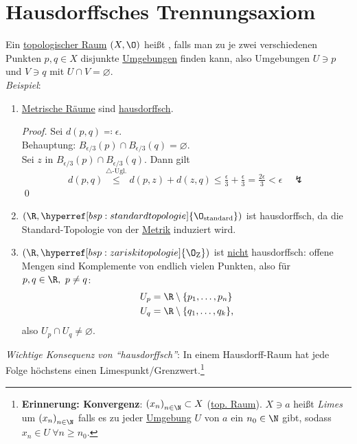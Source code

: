 \section{Hausdorffsches Trennungsaxiom}
\begin{remark}\label{def:hausdorffsch}
  Ein \hyperref[def:topologie]{topologischer Raum} \( (X,\O) \) heißt , falls man zu je zwei verschiedenen Punkten \( p,q \in X \) disjunkte \hyperref[def:umgebung]{Umgebungen} finden kann, also Umgebungen \( U \ni p \) und \( V \ni q \) mit \( U \cap V = \varnothing \). \\
  \emph{Beispiel}:
  \begin{enumerate}
    \item \hyperref[def:metrischerRaum]{Metrische Räume} sind \hyperref[def:hausdorffsch]{hausdorffsch}.
    \begin{proof}
       Sei \( d(p,q) \eqqcolon \epsilon \). \\
       Behauptung: \( B_{\epsilon/3}(p) \cap B_{\epsilon/3}(q) = \varnothing \). \\
       Sei \( z \) in \( B_{\epsilon/3}(p) \cap B_{\epsilon/3}(q) \). Dann gilt
       \begin{equation*}
         d(p,q) \overset{\triangle\text{-Ugl.}}{\leq} d(p,z)+d(z,q) \leq \tfrac{\epsilon}{3} + \tfrac{\epsilon}{3} = \tfrac{2\epsilon}{3} < \epsilon \quad \lightning
       \end{equation*}
       \qed{}
     \end{proof} 
    \item \( (\R, \hyperref[bsp:standardtopologie]{\O_\text{standard}}) \) ist hausdorffsch, da die Standard-Topologie von der \hyperref[def:metrik]{Metrik} induziert wird.
    \item \( (\R, \hyperref[bsp:zariskitopologie]{\O_\text{Z}}) \) ist \underline{nicht} hausdorffsch: offene Mengen sind Komplemente von endlich vielen Punkten, also für \( p, q \in \R, \ p \neq q \):
    \begin{align*}
      U_p &= \R \setminus \{ p_1, \dots, p_n \} \\
      U_q &= \R \setminus \{ q_1, \dots, q_k \}\text{,}
    \end{align*}
    also \( U_p \cap U_q \neq \varnothing \).
  \end{enumerate}
  \emph{Wichtige Konsequenz von ``hausdorffsch''}: In einem Hausdorff-Raum hat jede Folge höchstens einen Limespunkt/Grenzwert.\footnote{\textbf{Erinnerung: Konvergenz}\label{def:konvergenz}: \( {(x_n)}_{n \in \N} \subset X \) (\hyperref[def:topologie]{top. Raum}). \( X \ni a \) heißt \emph{Limes} um \( {(x_n)}_{n \in \N} \) falls es zu jeder \hyperref[def:umgebung]{Umgebung} \( U \) von \( a \) ein \( n_0 \in \N \) gibt, sodass \( x_n \in U \ \forall n \geq n_0 \).}
\end{remark}


